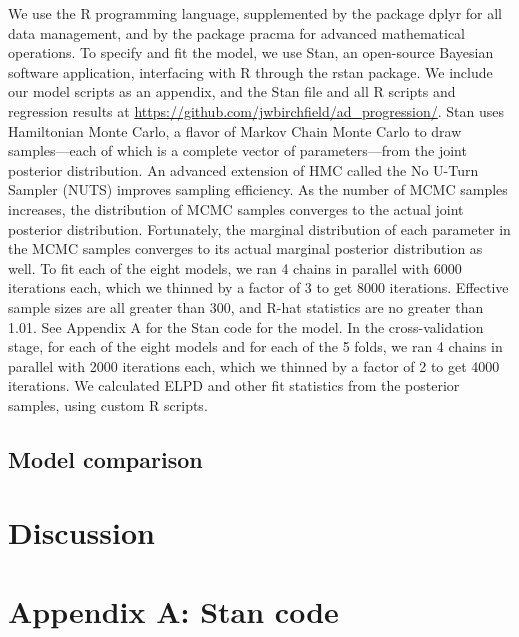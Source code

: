 \documentclass[12pt]{article}
\begin{document}
We use the R programming language, supplemented by the package dplyr for all data management, and by the package pracma for advanced mathematical operations. To specify and fit the model, we use Stan, an open-source Bayesian software application, interfacing with R through the rstan package. We include our model scripts as an appendix, and the Stan file and all R scripts and regression results at \url{https://github.com/jwbirchfield/ad\_progression/}. Stan uses Hamiltonian Monte Carlo, a flavor of Markov Chain Monte Carlo to draw samples—each of which is a complete vector of parameters—from the joint posterior distribution. An advanced extension of HMC called the No U-Turn Sampler (NUTS) improves sampling efficiency. As the number of MCMC samples increases, the distribution of MCMC samples converges to the actual joint posterior distribution. Fortunately, the marginal distribution of each parameter in the MCMC samples converges to its actual marginal posterior distribution as well. To fit each of the eight models, we ran 4 chains in parallel with 6000 iterations each, which we thinned by a factor of 3 to get 8000 iterations. Effective sample sizes are all greater than 300, and R-hat statistics are no greater than 1.01. See Appendix A for the Stan code for the model. In the cross-validation stage, for each of the eight models and for each of the 5 folds, we ran 4 chains in parallel with 2000 iterations each, which we thinned by a factor of 2 to get 4000 iterations. We calculated ELPD and other fit statistics from the posterior samples, using custom R scripts.

\pagebreak
\subsection{Model comparison}

\pagebreak
\section{Discussion}

\pagebreak
\section{Appendix A: Stan code}
\end{document}
